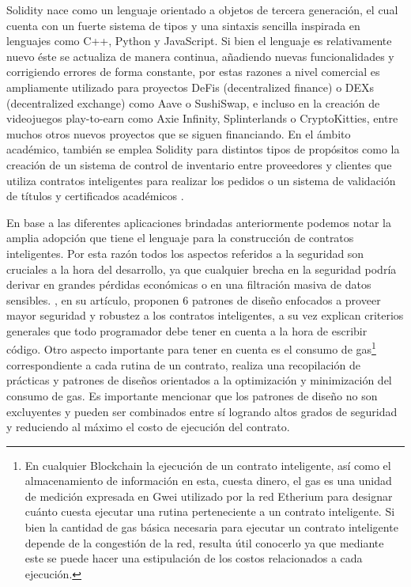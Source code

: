 \documentclass[a4paper,10pt]{article}
\begin{document}
	Solidity nace como un lenguaje orientado a objetos de tercera generación, el cual cuenta con un fuerte sistema de tipos y una sintaxis sencilla inspirada en lenguajes como C++, Python y JavaScript. Si bien el lenguaje es relativamente nuevo éste se actualiza de manera continua, añadiendo nuevas funcionalidades y corrigiendo errores de forma constante, por estas razones a nivel comercial es ampliamente utilizado para proyectos DeFis (decentralized finance) o DEXs (decentralized exchange) como Aave o SushiSwap, e incluso en la creación de videojuegos play-to-earn como Axie Infinity, Splinterlands o CryptoKitties, entre muchos otros nuevos proyectos que se siguen financiando. En el ámbito académico, también se emplea Solidity para distintos tipos de propósitos como la creación de un sistema de control de inventario entre proveedores y clientes que utiliza contratos inteligentes para realizar los pedidos \parencite{omar2021supply} o un sistema de validación de títulos y certificados académicos \parencite{bousaba2019degree}.
	
	En base a las diferentes aplicaciones brindadas anteriormente podemos notar la amplia adopción que tiene el lenguaje para la construcción de contratos inteligentes. Por esta razón todos los aspectos referidos a la seguridad son cruciales a la hora del desarrollo, ya que cualquier brecha en la seguridad podría derivar en grandes pérdidas económicas o en una filtración masiva de datos sensibles. \textcite{wohrer2018smart}, en su artículo, proponen 6 patrones de diseño enfocados a proveer mayor seguridad y robustez a los contratos inteligentes, a su vez explican criterios generales que todo programador debe tener en cuenta a la hora de escribir código. Otro aspecto importante para tener en cuenta es el consumo de gas\footnote{En cualquier Blockchain la ejecución de un contrato inteligente, así como el almacenamiento de información en esta, cuesta dinero, el gas es una unidad de medición expresada en Gwei utilizado por la red Etherium para designar cuánto cuesta ejecutar una rutina perteneciente a un contrato inteligente. Si bien la cantidad de gas básica necesaria para ejecutar un contrato inteligente depende de la congestión de la red, resulta útil conocerlo ya que mediante este se puede hacer una estipulación de los costos relacionados a cada ejecución.} correspondiente a cada rutina de un contrato, \textcite{marchesi2020design} realiza una recopilación de prácticas y patrones de diseños orientados a la optimización y minimización del consumo de gas. Es importante mencionar que los patrones de diseño no son excluyentes y pueden ser combinados entre sí logrando altos grados de seguridad y reduciendo al máximo el costo de ejecución del contrato.
	
\end{document}
